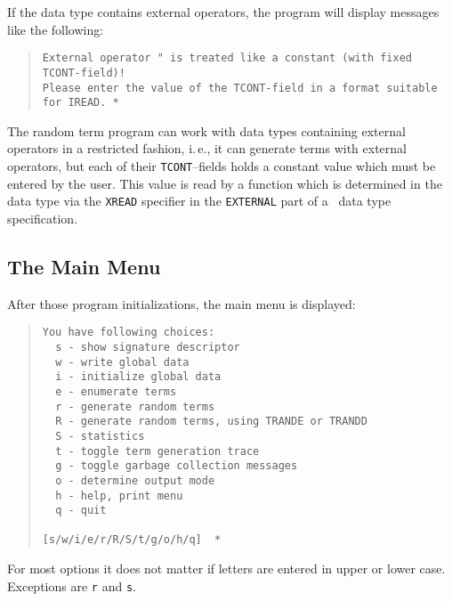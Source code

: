 If the data type contains external operators, the program will
display messages like the following:
\begin{quote}
\begin{verbatim}
External operator " is treated like a constant (with fixed TCONT-field)!
Please enter the value of the TCONT-field in a format suitable for IREAD. *
\end{verbatim}
\end{quote}
The random term program can work with data types containing external
operators in a restricted fashion, i.\,e., it can generate terms with
external operators, but each of their {\tt TCONT}--fields holds a
constant value which must be entered by the user.  This value is read
by a function which is determined in the data type via the {\tt XREAD}
specifier in the {\tt EXTERNAL} part of a \redux\ data type
specification.

\subsection{The Main Menu}
After those program initializations, the main menu is displayed:
\begin{quote}
\begin{verbatim}
You have following choices: 
  s - show signature descriptor
  w - write global data
  i - initialize global data
  e - enumerate terms
  r - generate random terms
  R - generate random terms, using TRANDE or TRANDD
  S - statistics
  t - toggle term generation trace
  g - toggle garbage collection messages
  o - determine output mode
  h - help, print menu
  q - quit
 
[s/w/i/e/r/R/S/t/g/o/h/q]  * 
\end{verbatim}
\end{quote}
For most options it does not matter if letters are entered in upper or
lower case.  Exceptions are {\tt r} and {\tt s}.

